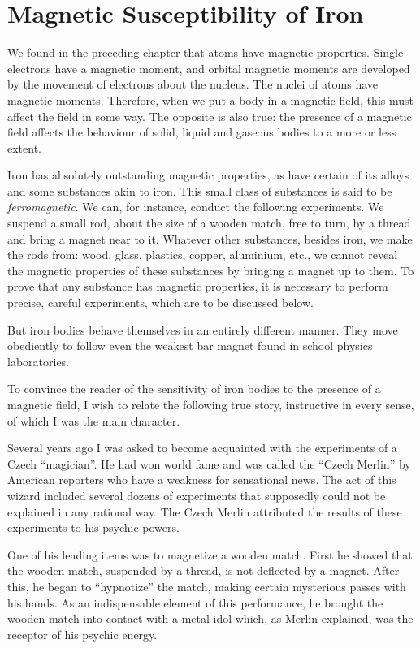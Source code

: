 \section{Magnetic Susceptibility of Iron}

We found in the preceding chapter that atoms have magnetic properties. Single electrons have a magnetic moment, and orbital magnetic moments are developed by the movement of electrons about the nucleus. The nuclei of atoms have magnetic moments. Therefore, when we put a body in a magnetic field, this must affect the field in some way. The opposite is also true: the presence of a magnetic field affects the behaviour of solid, liquid and gaseous bodies to a more or less extent.

Iron has absolutely outstanding magnetic properties, as have certain of its alloys and some substances akin to iron. This small class of substances is said to be \emph{ferromagnetic}. We can, for instance, conduct the following experiments. We suspend a small rod, about the size of a wooden match, free to turn, by a thread and bring a magnet near to it. Whatever other substances, besides iron, we make the rods from: wood, glass, plastics, copper, aluminium, etc., we cannot reveal the magnetic properties of these substances by bringing a magnet up to them. To prove that any substance has magnetic properties, it is necessary to perform precise, careful experiments, which are to be discussed below.

But iron bodies behave themselves in an entirely different manner. They move obediently to follow even the weakest bar magnet found in school physics laboratories.

To convince the reader of the sensitivity of iron bodies to the presence of a magnetic field, I wish to relate the following true story, instructive in every sense, of which I was the main character.

Several years ago I was asked to become acquainted with the experiments of a Czech ``magician''. He had won world fame and was called the ``Czech Merlin'' by American reporters who have a weakness for sensational news. The act of this wizard included several dozens of experiments that supposedly could not be explained in any rational way. The Czech Merlin attributed the results of these experiments to his psychic powers.

One of his leading items was to magnetize a wooden match. First he showed that the wooden match, suspended by a thread, is not deflected by a magnet. After this, he began to ``hypnotize'' the match, making certain mysterious passes with his hands. As an indispensable element of this performance, he brought the wooden match into contact with a metal idol which, as Merlin explained, was the receptor of his psychic energy.

